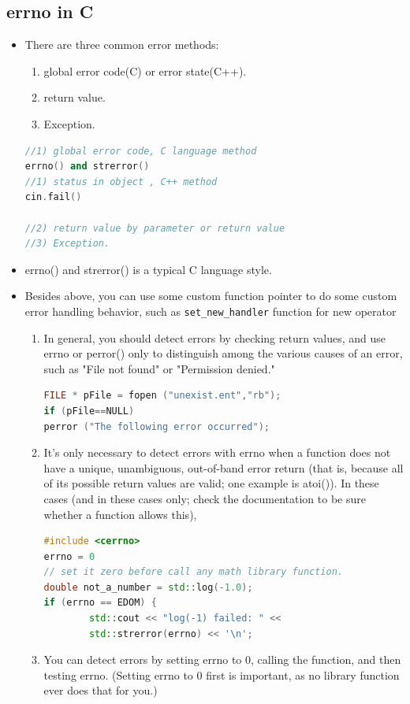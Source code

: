 \documentclass[a4paper,11pt,twoside]{book}
\begin{document}
\subsection{errno in C}
\begin{itemize}
	
	\item There are three common error methods:
	\begin{enumerate}
		\item global error code(C) or error state(C++).
		\item return value.
		\item Exception.
	\end{enumerate}
\begin{lstlisting}[frame=single, language=c++]
//1) global error code, C language method
errno() and strerror()
//1) status in object , C++ method
cin.fail()
	
//2) return value by parameter or return value
//3) Exception.
	\end{lstlisting}
	
	\item errno() and strerror() is a typical C language style.
	
	
	\item Besides above, you can use some custom function pointer to do some custom error handling behavior, such as \texttt{set\_new\_handler} function for new operator
	
	\begin{enumerate}
		\item In general, you should detect errors by checking return values, and use errno or perror() only to distinguish among the various causes of an error, such as "File not found" or "Permission denied."
		
\begin{lstlisting}[frame=single, language=c++]
FILE * pFile = fopen ("unexist.ent","rb");
if (pFile==NULL)
perror ("The following error occurred");
\end{lstlisting}
		
		\item It's only necessary to detect errors with errno when a function does not have a unique, unambiguous, out-of-band error return (that is, because all of its possible return values are valid; one example is atoi()). In these cases (and in these cases only; check the documentation to be sure whether a function allows this),
\begin{lstlisting}[frame=single, language=c++]
#include <cerrno>
errno = 0
// set it zero before call any math library function.
double not_a_number = std::log(-1.0);
if (errno == EDOM) {
		std::cout << "log(-1) failed: " <<
		std::strerror(errno) << '\n';
\end{lstlisting}
		\item You can detect errors by setting errno to 0, calling the function, and then testing errno. (Setting errno to 0 first is important, as no library function ever does that for you.)
	\end{enumerate}
	

\end{itemize}
\end{document}
